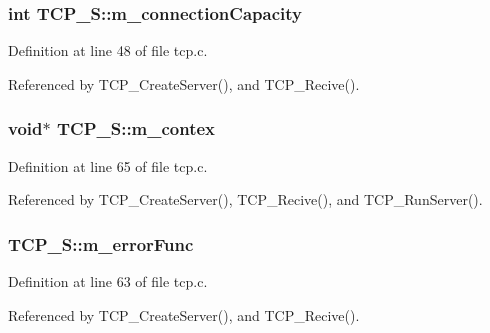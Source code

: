 \subsubsection[{\texorpdfstring{m\+\_\+connection\+Capacity}{m_connectionCapacity}}]{\setlength{\rightskip}{0pt plus 5cm}int T\+C\+P\+\_\+\+S\+::m\+\_\+connection\+Capacity}\hypertarget{structTCP__S_a77a2c693cfe0dcb321ae26f6cf347ab9}{}\label{structTCP__S_a77a2c693cfe0dcb321ae26f6cf347ab9}


Definition at line 48 of file tcp.\+c.



Referenced by T\+C\+P\+\_\+\+Create\+Server(), and T\+C\+P\+\_\+\+Recive().

\subsubsection[{\texorpdfstring{m\+\_\+contex}{m_contex}}]{\setlength{\rightskip}{0pt plus 5cm}void$\ast$ T\+C\+P\+\_\+\+S\+::m\+\_\+contex}\hypertarget{structTCP__S_a998879b4718153a64a41bc2e4c4e97b8}{}\label{structTCP__S_a998879b4718153a64a41bc2e4c4e97b8}


Definition at line 65 of file tcp.\+c.



Referenced by T\+C\+P\+\_\+\+Create\+Server(), T\+C\+P\+\_\+\+Recive(), and T\+C\+P\+\_\+\+Run\+Server().

\subsubsection[{\texorpdfstring{m\+\_\+error\+Func}{m_errorFunc}}]{ T\+C\+P\+\_\+\+S\+::m\+\_\+error\+Func}\hypertarget{structTCP__S_ad047d75ba90917949677d9f6af69c017}{}\label{structTCP__S_ad047d75ba90917949677d9f6af69c017}


Definition at line 63 of file tcp.\+c.



Referenced by T\+C\+P\+\_\+\+Create\+Server(), and T\+C\+P\+\_\+\+Recive().

